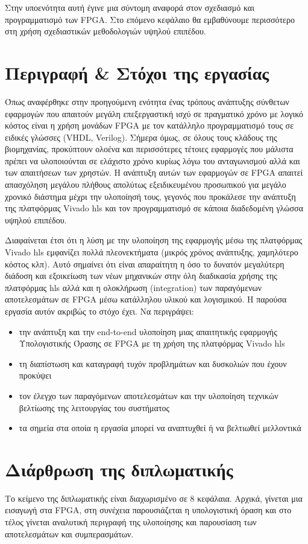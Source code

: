 Στην υποενότητα αυτή έγινε μια σύντομη αναφορά στον σχεδιασμό και προγραμματισμό των FPGA. Στο επόμενο κεφάλαιο θα εμβαθύνουμε περισσότερο στη χρήση σχεδιαστικών μεθοδολογιών υψηλού επιπέδου.

\section{Περιγραφή \& Στόχοι της εργασίας}

Όπως αναφέρθηκε στην προηγούμενη ενότητα ένας τρόπους ανάπτυξης σύνθετων εφαρμογών που απαιτούν μεγάλη επεξεργαστική ισχύ σε πραγματικό χρόνο με λογικό κόστος είναι η χρήση μονάδων FPGA με τον κατάλληλο προγραμματισμό τους σε ειδικές γλώσσες  (VHDL, Verilog). Σήμερα όμως, σε όλους τους κλάδους της βιομηχανίας, προκύπτουν ολοένα και περισσότερες τέτοιες εφαρμογές που μάλιστα πρέπει να υλοποιούνται σε ελάχιστο χρόνο κυρίως λόγω του ανταγωνισμού αλλά και των απαιτήσεων των χρηστών. Η ανάπτυξη αυτών των εφαρμογών σε FPGA απαιτεί απασχόληση μεγάλου πλήθους απολύτως εξειδικευμένου προσωπικού για μεγάλο χρονικό διάστημα μέχρι την υλοποίησή τους, γεγονός που προκάλεσε την ανάπτυξη της πλατφόρμας Vivado \gls{hls} και τον προγραμματισμό σε κάποια διαδεδομένη γλώσσα υψηλού επιπέδου.

Διαφαίνεται έτσι ότι η λύση με την υλοποίηση της εφαρμογής μέσω της πλατφόρμας Vivado \gls{hls} εμφανίζει πολλά πλεονεκτήματα  (μικρός χρόνος ανάπτυξης, χαμηλότερο κόστος κλπ). Αυτό σημαίνει ότι είναι απαραίτητη η όσο το δυνατόν μεγαλύτερη διάδοση και εξοικείωση των νέων μηχανικών στην όλη διαδικασία χρήσης της πλατφόρμας \gls{hls} αλλά και η ολοκλήρωση (integration) των παραγόμενων αποτελεσμάτων σε FPGA μέσω κατάλληλου υλικού και λογισμικού. Η παρούσα εργασία αυτόν ακριβώς το στόχο έχει. Να περιγράψει:
\begin{itemize}
\item{την ανάπτυξη και την end-to-end υλοποίηση μιας απαιτητικής εφαρμογής Υπολογιστικής Όρασης σε FPGA με τη χρήση της πλατφόρμας Vivado \gls{hls}}
\item{τη διαπίστωση και καταγραφή τυχόν προβλημάτων και δυσκολιών που έχουν προκύψει}
\item{τον έλεγχο των παραγόμενων αποτελεσμάτων και την υλοποίηση τεχνικών βελτίωσης της λειτουργίας του συστήματος}
\item{τα σημεία στα οποία η εργασία μπορεί να αναπτυχθεί ή να βελτιωθεί μελλοντικά}
\end{itemize}
\section{Διάρθρωση της διπλωματικής}
\noindent
Το κείμενο της διπλωματικής είναι διαχωρισμένο σε 8 κεφάλαια. Αρχικά, γίνεται μια εισαγωγή στα FPGA, στη συνέχεια παρουσιάζεται η υπολογιστική όραση και στο τέλος γίνεται αναλυτική περιγραφή της υλοποίησης και παρουσίαση των αποτελεσμάτων και συμπερασμάτων. \\

